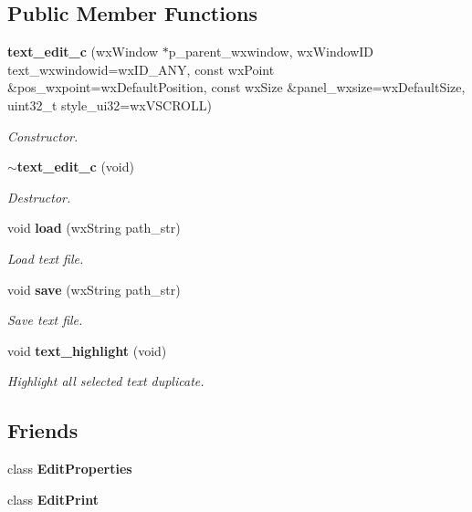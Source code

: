 \subsection*{Public Member Functions}
\begin{DoxyCompactItemize}
\item 
\textbf{ text\+\_\+edit\+\_\+c} (wx\+Window $\ast$p\+\_\+parent\+\_\+wxwindow, wx\+Window\+ID text\+\_\+wxwindowid=wx\+I\+D\+\_\+\+A\+NY, const wx\+Point \&pos\+\_\+wxpoint=wx\+Default\+Position, const wx\+Size \&panel\+\_\+wxsize=wx\+Default\+Size, uint32\+\_\+t style\+\_\+ui32=wx\+V\+S\+C\+R\+O\+LL)
\begin{DoxyCompactList}\small\item\em Constructor. \end{DoxyCompactList}\item 
\textbf{ $\sim$text\+\_\+edit\+\_\+c} (void)
\begin{DoxyCompactList}\small\item\em Destructor. \end{DoxyCompactList}\item 
void \textbf{ load} (wx\+String path\+\_\+str)
\begin{DoxyCompactList}\small\item\em Load text file. \end{DoxyCompactList}\item 
void \textbf{ save} (wx\+String path\+\_\+str)
\begin{DoxyCompactList}\small\item\em Save text file. \end{DoxyCompactList}\item 
void \textbf{ text\+\_\+highlight} (void)
\begin{DoxyCompactList}\small\item\em Highlight all selected text duplicate. \end{DoxyCompactList}\end{DoxyCompactItemize}
\subsection*{Friends}
\begin{DoxyCompactItemize}
\item 
\mbox{\label{classtext__edit__c_a500387361234a2fd8343f4673951f68d}} 
class {\bfseries Edit\+Properties}
\item 
\mbox{\label{classtext__edit__c_abe05a77802c8bdef1ff7bdc9171d4391}} 
class {\bfseries Edit\+Print}
\end{DoxyCompactItemize}


